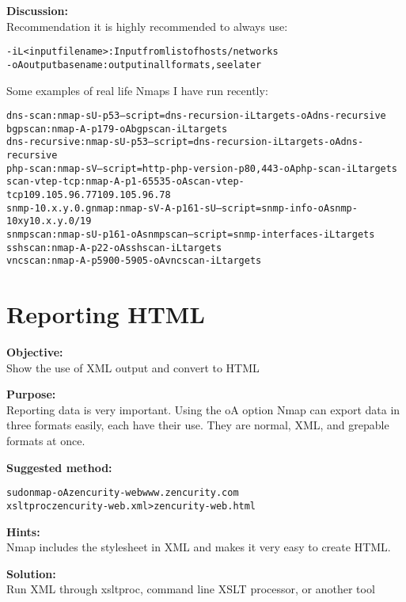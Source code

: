 \documentclass[a4paper,11pt,notitlepage]{report}
\begin{document}
{\bf Discussion:}\\
Recommendation it is highly recommended to always use:
\begin{alltt}
-iL <inputfilename>: Input from list of hosts/networks
-oA outputbasename: output in all formats, see later
\end{alltt}

Some examples of real life Nmaps I have run recently:
\begin{alltt}
dns-scan: nmap -sU -p 53 --script=dns-recursion -iL targets -oA dns-recursive
bgpscan: nmap -A -p 179 -oA bgpscan -iL targets
dns-recursive: nmap -sU -p 53 --script=dns-recursion -iL targets -oA dns-recursive
php-scan: nmap -sV --script=http-php-version -p80,443 -oA php-scan -iL targets
scan-vtep-tcp: nmap -A -p 1-65535 -oA scan-vtep-tcp 109.105.96.77 109.105.96.78
snmp-10.x.y.0.gnmap: nmap -sV -A -p 161 -sU --script=snmp-info -oA snmp-10xy 10.x.y.0/19
snmpscan: nmap -sU -p 161 -oA snmpscan --script=snmp-interfaces -iL targets
sshscan: nmap -A -p 22 -oA sshscan -iL targets
vncscan: nmap -A -p 5900-5905 -oA vncscan -iL targets
\end{alltt}




\chapter{Reporting HTML}
\label{ex:nmap-html}


{\bf Objective:} \\
Show the use of XML output and convert to HTML

{\bf Purpose:}\\
Reporting data is very important. Using the oA option Nmap can export data in three formats easily, each have their use. They are normal, XML, and grepable formats at once.

{\bf Suggested method:}\\
\begin{alltt}
  sudo nmap -oA zencurity-web www.zencurity.com
  xsltproc zencurity-web.xml > zencurity-web.html
\end{alltt}

{\bf Hints:} \\
Nmap includes the stylesheet in XML and makes it very easy to create HTML.

{\bf Solution:}\\
Run XML through xsltproc, command line XSLT processor, or another tool
\end{document}
